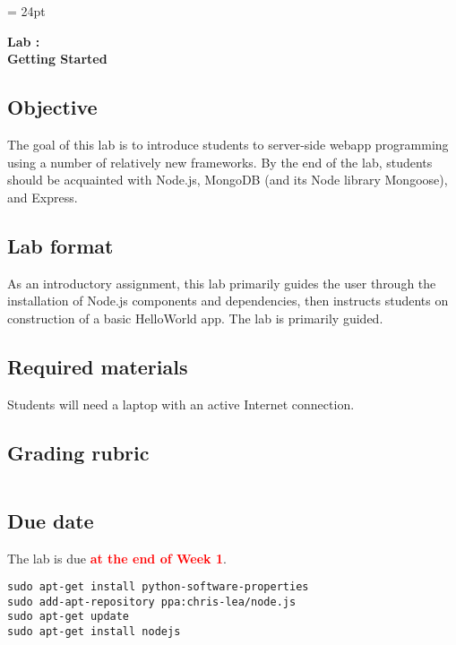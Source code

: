 \documentclass{article}
\newcommand{\labduedate}{at the end of Week 1}
\begin{document}
\chead{\textcolor{Gray}{CSSE491 -- Scalable Computing Lab Assignment}}
\headsep = 24pt

\begin{center}
{ \large
\textbf{Lab \labnumber: \longproductname} \\
\textbf{Getting Started}
}
\end{center}

\subsection*{Objective}
The goal of this lab is to introduce students to server-side webapp programming using a number of relatively new frameworks. By the end of the lab, students should be acquainted with Node.js, MongoDB (and its Node library Mongoose), and Express.

\subsection*{Lab format}
As an introductory assignment, this lab primarily guides the user through the installation of Node.js components and dependencies, then instructs students on construction of a basic HelloWorld app. The lab is primarily guided.

\subsection*{Required materials}
Students will need a laptop with an active Internet connection.

\subsection*{Grading rubric}
\begin{tabular}{p{5.5in} r}
\end{tabular}

\subsection*{Due date}
The lab is due \textcolor{red}{\textbf{\labduedate}}.




\begin{verbatim}
sudo apt-get install python-software-properties
sudo add-apt-repository ppa:chris-lea/node.js
sudo apt-get update
sudo apt-get install nodejs
\end{verbatim}
\end{document}
